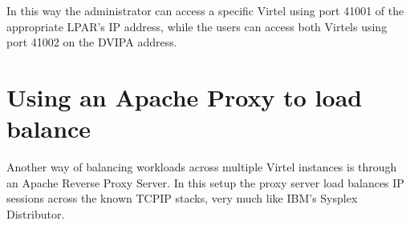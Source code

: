 \documentclass[letterpaper,10pt,english]{sphinxmanual}
\begin{document}
\begin{sphinxVerbatim}[commandchars=\\\{\}]
 
 
    
      
    
    
    
   
\end{sphinxVerbatim}

\sphinxAtStartPar
In this way the administrator can access a specific Virtel using port 41001 of the appropriate LPAR’s IP address, while the users can access both Virtels using port 41002 on the DVIPA address.

\newpage

\ignorespaces 

\section{Using an Apache Proxy to load balance}
\label{\detokenize{connectivity_guide:using-an-apache-proxy-to-load-balance}}\label{\detokenize{connectivity_guide:index-175}}
\sphinxAtStartPar
Another way of balancing workloads across multiple Virtel instances is through an Apache Reverse Proxy Server. In this setup the proxy server load balances IP sessions across the known TCPIP stacks, very much like IBM’s Sysplex Distributor.
\end{document}
